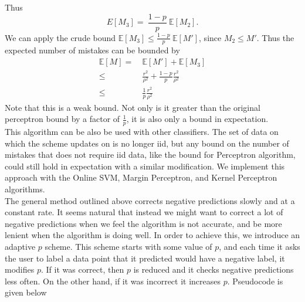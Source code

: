 \documentclass[12pt]{article}
\newcommand{\E}[0]{\mathbb{E}}
\begin{document}
Thus
\[
E[M_3] = \ \frac{1-p}{p}\ \E[M_2].
\]
We can apply the crude bound $\E[M_3] \leq \frac{1-p}{p}\ \E[M']$, since $M_2 \leq M'$. Thus the expected number of mistakes can be bounded by
\begin{align*}
\E[M]  =  &\ \E[M'] + \E[M_3] \\
\leq & \ \frac{r^2}{\rho^2} + \frac{1-p}{p}\frac{r^2}{\rho^2} \\
\leq  & \ \frac{1}{p}\frac{r^2}{\rho^2}
\end{align*}
Note that this is a weak bound.  Not only is it greater than the
original perceptron bound by a factor of $\frac{1}{p}$, it is also only a
bound in expectation.\\

This algorithm can be also be used with other classifiers.  The set of data on which the scheme updates on is no longer iid, but any bound on the number of mistakes that does not require iid data, like the bound for Perceptron algorithm, could still hold in expectation with a similar modification. We implement this approach with the Online SVM, Margin Perceptron, and Kernel Perceptron algorithms.  \\
The general method outlined above corrects negative predictions slowly and at a constant rate.  It seems natural that instead we might want to correct a lot of negative predictions when we feel the algorithm is not accurate, and be more lenient when the algorithm is doing well.  In order to achieve this, we introduce an adaptive $p$ scheme.  This scheme starts with some value of $p$, and each time it asks the user to label a data point that it predicted would have a negative label, it modifies $p$.  If it was correct, then $p$ is reduced and it checks negative predictions less often.  On the other hand, if it was incorrect it increases $p$. Pseudocode is given below \\
\end{document}
